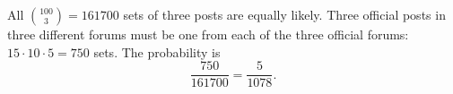 All $\binom{100}{3}=161700$ sets of three posts are equally likely. Three official posts in three different forums must be one from each of the three official forums: $15\cdot10\cdot5=750$ sets. The probability is
\[
\dfrac{750}{161700}=\boxed{\dfrac{5}{1078}}.
\]
